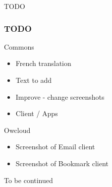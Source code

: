 \documentclass{beamer}
\begin{document}
\begin{frame}
\Huge{\centerline{TODO}}
\end{frame}

\begin{frame}
\frametitle{TODO}

\begin{block}{Commons}
\begin{itemize}
\item French translation
\item Text to add
\item Improve - change screenshots
\item Client / Apps
\end{itemize}
\end{block}

\begin{block}{Owcloud}
\begin{itemize}
\item Screenshot of Email client
 \item Screenshot of Bookmark client
\end{itemize}
\end{block}
\end{frame}

\begin{frame}
\Huge{\centerline{To be continued}}
\end{frame}
\end{document}
